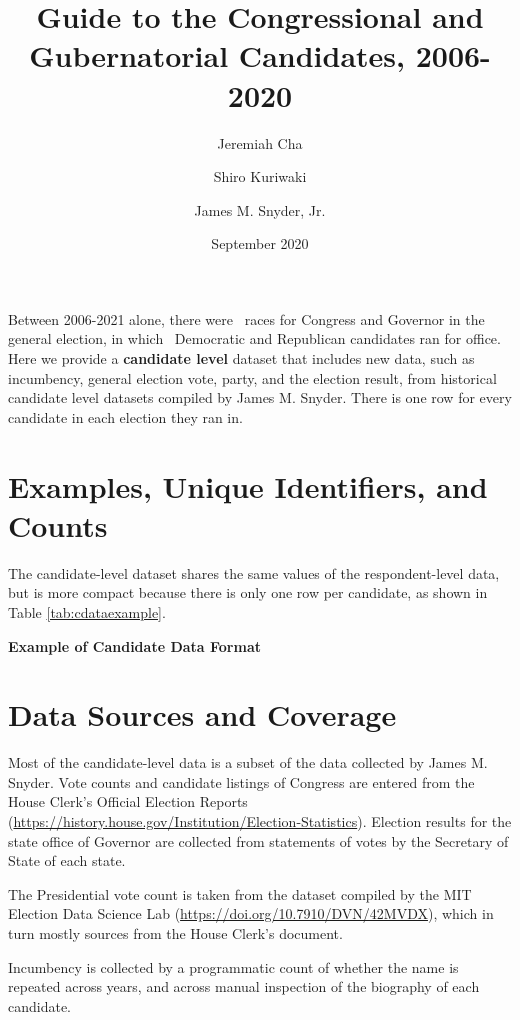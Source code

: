 \documentclass[12pt]{article}
\title{\large\textbf{Guide to the Congressional and Gubernatorial Candidates, 2006-2020}}
\author[1]{\normalsize Jeremiah Cha}
\author[2]{\normalsize Shiro Kuriwaki}
\author[1]{\normalsize James M. Snyder, Jr.}
\affil[1]{\footnotesize Department of Government, Harvard University.}
\affil[2]{\footnotesize To be Department of Political Science, Yale University}
\date{\normalsize September 2020}
\begin{document}
\maketitle 

Between 2006-2021 alone, there were \unskip \ races for Congress and Governor in the general election, in which \unskip \ Democratic and Republican candidates ran for office.  Here we provide a \textbf{candidate level} dataset that includes new data, such as incumbency, general election vote, party, and the election result, from historical candidate level datasets compiled by James M. Snyder. There is one row for every candidate in each election they ran in. 


\section{Examples, Unique Identifiers, and Counts}

The candidate-level dataset shares the same values of the respondent-level data, but is more compact because there is only one row per candidate, as shown in Table \ref{tab:cdataexample}.

\begin{table}[!h]
\caption{\textbf{Example of Candidate Data Format} \label{tab:cdataexample}}
\centering
\footnotesize

\end{table}

\section{Data Sources and Coverage}

Most of the candidate-level data is a subset of the data collected by James M. Snyder. Vote counts and candidate listings of Congress are entered from the House Clerk's Official Election Reports (\url{https://history.house.gov/Institution/Election-Statistics}).  Election results for the state office of Governor are collected from statements of votes by the Secretary of State of each state.

The Presidential vote count is taken from the dataset compiled by the MIT Election Data Science Lab (\url{https://doi.org/10.7910/DVN/42MVDX}), which in turn mostly sources from the House Clerk's document.

Incumbency is collected by a programmatic count of whether the name is repeated across years, and across manual inspection of the biography of each candidate.
\end{document}
